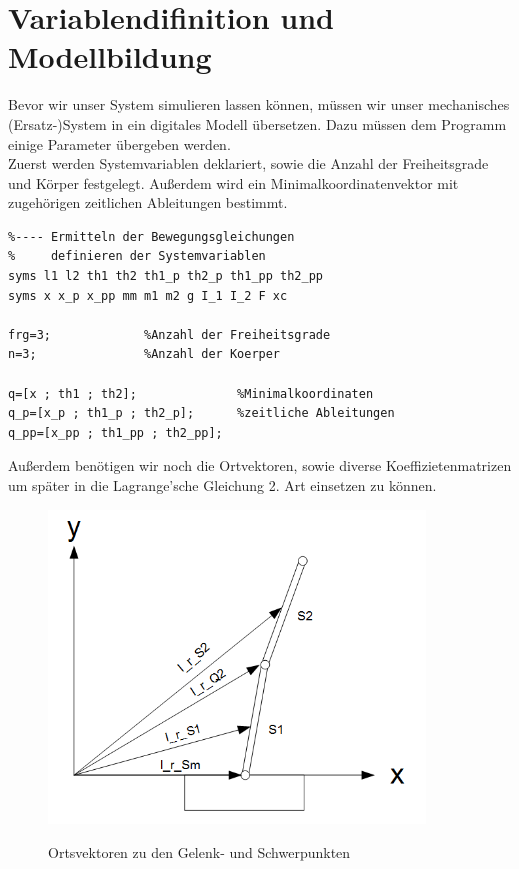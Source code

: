 \documentclass[a4paper, 10pt]{report}
\begin{document}
 \section{Variablendifinition und Modellbildung}
Bevor wir unser System simulieren lassen können, müssen wir unser mechanisches (Ersatz-)System in ein digitales Modell übersetzen. Dazu müssen dem Programm einige Parameter übergeben werden.\\
Zuerst werden Systemvariablen deklariert, sowie die Anzahl der Freiheitsgrade und Körper festgelegt. Außerdem wird ein Minimalkoordinatenvektor mit zugehörigen zeitlichen Ableitungen bestimmt.
\begin{lstlisting}
%---- Ermitteln der Bewegungsgleichungen
%     definieren der Systemvariablen
syms l1 l2 th1 th2 th1_p th2_p th1_pp th2_pp
syms x x_p x_pp mm m1 m2 g I_1 I_2 F xc

frg=3;             %Anzahl der Freiheitsgrade
n=3;               %Anzahl der Koerper

q=[x ; th1 ; th2];              %Minimalkoordinaten
q_p=[x_p ; th1_p ; th2_p];      %zeitliche Ableitungen
q_pp=[x_pp ; th1_pp ; th2_pp];
\end{lstlisting}
\newpage \noindent
Außerdem benötigen wir noch die Ortvektoren, sowie diverse Koeffizietenmatrizen um später in die Lagrange'sche Gleichung 2. Art einsetzen zu können. 
\begin{figure}[h]
\centering  %
{\includegraphics[width=10cm]{Ortsvektoren}}
\caption{Ortsvektoren zu den Gelenk- und Schwerpunkten}
\end{figure}
\end{document}
